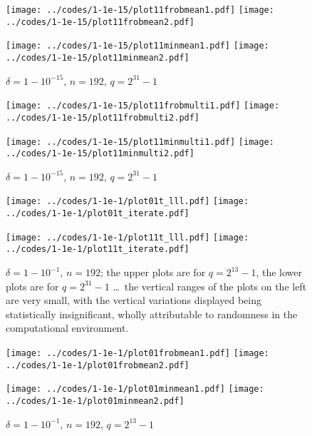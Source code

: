 \documentclass[supplement,hidelinks,onefignum,onetabnum]{siamart220329}
\begin{document}
\begin{figure}
\begin{centering}
{\texttt{[image: ../codes/1-1e-15/plot11frobmean1.pdf]}}
{\texttt{[image: ../codes/1-1e-15/plot11frobmean2.pdf]}}

{\texttt{[image: ../codes/1-1e-15/plot11minmean1.pdf]}}
{\texttt{[image: ../codes/1-1e-15/plot11minmean2.pdf]}}

\end{centering}
\caption{$\delta = 1-10^{-15}$, $n = 192$, $q = 2^{31} - 1$}
\end{figure}

\begin{figure}
\begin{centering}
{\texttt{[image: ../codes/1-1e-15/plot11frobmulti1.pdf]}}
{\texttt{[image: ../codes/1-1e-15/plot11frobmulti2.pdf]}}

{\texttt{[image: ../codes/1-1e-15/plot11minmulti1.pdf]}}
{\texttt{[image: ../codes/1-1e-15/plot11minmulti2.pdf]}}

\end{centering}
\caption{$\delta = 1-10^{-15}$, $n = 192$, $q = 2^{31} - 1$}
\label{pserr1-1e-15-31}
\end{figure}

\begin{figure}
\begin{centering}
{\texttt{[image: ../codes/1-1e-1/plot01t\_lll.pdf]}}
{\texttt{[image: ../codes/1-1e-1/plot01t\_iterate.pdf]}}

{\texttt{[image: ../codes/1-1e-1/plot11t\_lll.pdf]}}
{\texttt{[image: ../codes/1-1e-1/plot11t\_iterate.pdf]}}

\end{centering}
\caption{$\delta = 1-10^{-1}$, $n = 192$;
         the upper plots are for $q = 2^{13} - 1$,
         the lower plots are for $q = 2^{31} - 1$ \dots\
         the vertical ranges of the plots on the left are very small,
         with the vertical variations displayed
         being statistically insignificant, wholly attributable to randomness
         in the computational environment.}
\label{pstime1-1e-1}
\end{figure}

\begin{figure}
\begin{centering}
{\texttt{[image: ../codes/1-1e-1/plot01frobmean1.pdf]}}
{\texttt{[image: ../codes/1-1e-1/plot01frobmean2.pdf]}}

{\texttt{[image: ../codes/1-1e-1/plot01minmean1.pdf]}}
{\texttt{[image: ../codes/1-1e-1/plot01minmean2.pdf]}}

\end{centering}
\caption{$\delta = 1-10^{-1}$, $n = 192$, $q = 2^{13} - 1$}
\end{figure}
\end{document}
